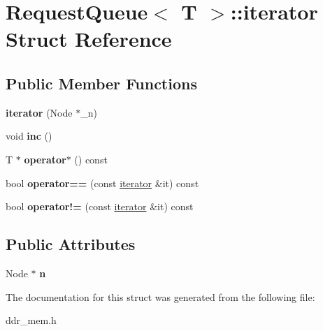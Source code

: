 \hypertarget{structRequestQueue_1_1iterator}{\section{Request\-Queue$<$ T $>$\-:\-:iterator Struct Reference}
\label{structRequestQueue_1_1iterator}
}
\subsection*{Public Member Functions}
\begin{DoxyCompactItemize}
\item 
\hypertarget{structRequestQueue_1_1iterator_a81c02458f73e4abcc164721bc7bf9ec8}{{\bfseries iterator} (Node $\ast$\-\_\-n)}\label{structRequestQueue_1_1iterator_a81c02458f73e4abcc164721bc7bf9ec8}

\item 
\hypertarget{structRequestQueue_1_1iterator_a4410e25d6c56a96f4f2c88c6f526f59c}{void {\bfseries inc} ()}\label{structRequestQueue_1_1iterator_a4410e25d6c56a96f4f2c88c6f526f59c}

\item 
\hypertarget{structRequestQueue_1_1iterator_a4a30ee1943a2ed409656b28943b5b9d6}{T $\ast$ {\bfseries operator$\ast$} () const }\label{structRequestQueue_1_1iterator_a4a30ee1943a2ed409656b28943b5b9d6}

\item 
\hypertarget{structRequestQueue_1_1iterator_a9732619b2d13264887cfc4762f4a2ab2}{bool {\bfseries operator==} (const \hyperlink{structRequestQueue_1_1iterator}{iterator} \&it) const }\label{structRequestQueue_1_1iterator_a9732619b2d13264887cfc4762f4a2ab2}

\item 
\hypertarget{structRequestQueue_1_1iterator_af4f57acd1a7ebdc7f3a896adc726b27e}{bool {\bfseries operator!=} (const \hyperlink{structRequestQueue_1_1iterator}{iterator} \&it) const }\label{structRequestQueue_1_1iterator_af4f57acd1a7ebdc7f3a896adc726b27e}

\end{DoxyCompactItemize}
\subsection*{Public Attributes}
\begin{DoxyCompactItemize}
\item 
\hypertarget{structRequestQueue_1_1iterator_ab878741bb5be28de2f25ac07ad5d3038}{Node $\ast$ {\bfseries n}}\label{structRequestQueue_1_1iterator_ab878741bb5be28de2f25ac07ad5d3038}

\end{DoxyCompactItemize}


The documentation for this struct was generated from the following file\-:\begin{DoxyCompactItemize}
\item 
ddr\-\_\-mem.\-h\end{DoxyCompactItemize}
